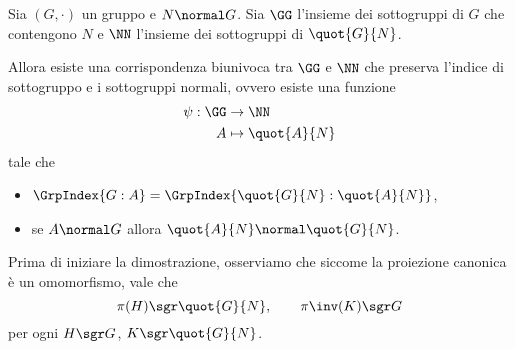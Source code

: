 \begin{theorem}
    Sia $(G, \cdot)$ un gruppo e $N \normal G$. Sia $\GG$ l'insieme dei sottogruppi di $G$ che contengono $N$ e $\NN$ l'insieme dei sottogruppi di $\quot{G}{N}$.

    Allora esiste una corrispondenza biunivoca tra $\GG$ e $\NN$ che preserva l'indice di sottogruppo e i sottogruppi normali, ovvero esiste una funzione \begin{align*}
        \begin{split}
            \psi : \GG &\to \NN\\
            A &\mapsto \quot{A}{N}
        \end{split}
    \end{align*}    
    tale che \begin{itemize}
        \item $\GrpIndex{G:A} = \GrpIndex{\quot{G}{N} : \quot{A}{N}}$,
        \item se $A \normal G$ allora $\quot{A}{N} \normal \quot{G}{N}$.
    \end{itemize}
\end{theorem}
Prima di iniziare la dimostrazione, osserviamo che siccome la proiezione canonica è un omomorfismo, vale che \[
    \pi(H) \sgr \quot{G}{N}, \qquad \pi\inv(K) \sgr G    
\] per ogni $H \sgr G$, $K \sgr \quot{G}{N}$.
